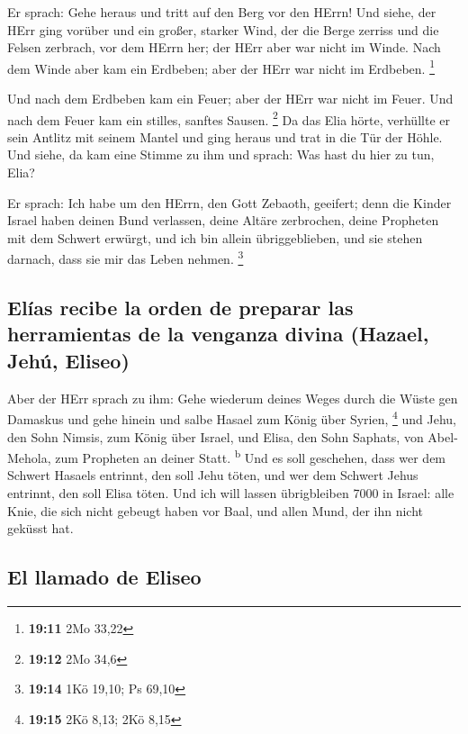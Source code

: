  Er sprach: Gehe heraus und tritt auf den Berg vor den
HErrn! Und siehe, der HErr ging vorüber und ein großer, starker Wind,
der die Berge zerriss und die Felsen zerbrach, vor dem HErrn her; der
HErr aber war nicht im Winde. Nach dem Winde aber kam ein Erdbeben; aber
der HErr war nicht im Erdbeben. \footnote{\textbf{19:11} 2Mo 33,22}

 Und nach dem Erdbeben kam ein Feuer; aber der HErr war
nicht im Feuer. Und nach dem Feuer kam ein stilles, sanftes Sausen.
\footnote{\textbf{19:12} 2Mo 34,6}  Da das Elia hörte,
verhüllte er sein Antlitz mit seinem Mantel und ging heraus und trat in
die Tür der Höhle. Und siehe, da kam eine Stimme zu ihm und sprach: Was
hast du hier zu tun, Elia?

 Er sprach: Ich habe um den HErrn, den Gott Zebaoth,
geeifert; denn die Kinder Israel haben deinen Bund verlassen, deine
Altäre zerbrochen, deine Propheten mit dem Schwert erwürgt, und ich bin
allein übriggeblieben, und sie stehen darnach, dass sie mir das Leben
nehmen. \footnote{\textbf{19:14} 1Kö 19,10; Ps 69,10}

\hypertarget{eluxedas-recibe-la-orden-de-preparar-las-herramientas-de-la-venganza-divina-hazael-jehuxfa-eliseo}{%
\subsection{Elías recibe la orden de preparar las herramientas de la
venganza divina (Hazael, Jehú,
Eliseo)}\label{eluxedas-recibe-la-orden-de-preparar-las-herramientas-de-la-venganza-divina-hazael-jehuxfa-eliseo}}

 Aber der HErr sprach zu ihm: Gehe wiederum deines Weges
durch die Wüste gen Damaskus und gehe hinein und salbe Hasael zum König
über Syrien, \footnote{\textbf{19:15} 2Kö 8,13; 2Kö 8,15}
 und Jehu, den Sohn Nimsis, zum König über Israel, und
Elisa, den Sohn Saphats, von Abel-Mehola, zum Propheten an deiner Statt.
\textsuperscript{b}  Und es soll geschehen, dass wer dem
Schwert Hasaels entrinnt, den soll Jehu töten, und wer dem Schwert Jehus
entrinnt, den soll Elisa töten.  Und ich will lassen
übrigbleiben 7000 in Israel: alle Knie, die sich nicht gebeugt haben vor
Baal, und allen Mund, der ihn nicht geküsst hat.

\hypertarget{el-llamado-de-eliseo}{%
\subsection{El llamado de Eliseo}\label{el-llamado-de-eliseo}}

